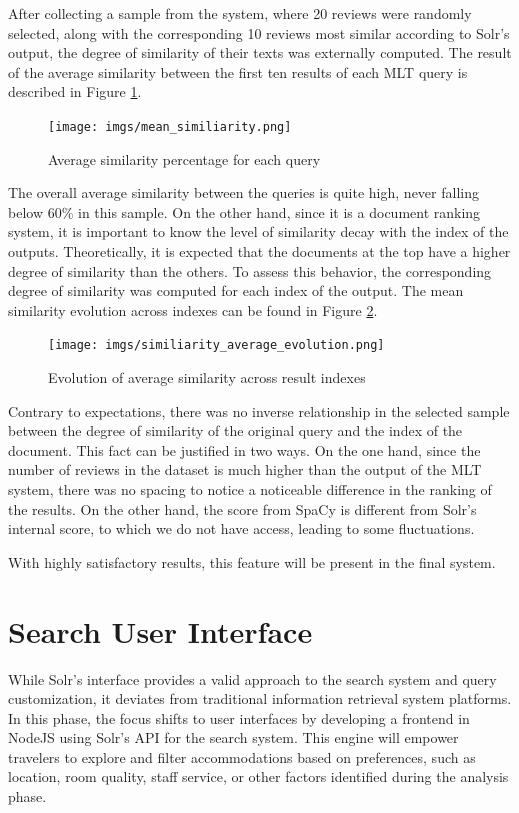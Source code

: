 \documentclass[sigconf]{acmart}
\begin{document}
After collecting a sample from the system, where 20 reviews were randomly selected, along with the corresponding 10 reviews most similar according to Solr's output, the degree of similarity of their texts was externally computed. The result of the average similarity between the first ten results of each MLT query is described in Figure \ref{fig:avg_simi}.

\begin{figure}[h]
  \centering
  \texttt{[image: imgs/mean\_similiarity.png]}
  \caption{Average similarity percentage for each query}
  \label{fig:avg_simi}
\end{figure}

The overall average similarity between the queries is quite high, never falling below 60\% in this sample. On the other hand, since it is a document ranking system, it is important to know the level of similarity decay with the index of the outputs. Theoretically, it is expected that the documents at the top have a higher degree of similarity than the others. To assess this behavior, the corresponding degree of similarity was computed for each index of the output. The mean similarity evolution across indexes can be found in Figure \ref{fig:simi_avg_evo}.


\begin{figure}[h]
  \centering
  \texttt{[image: imgs/similiarity\_average\_evolution.png]}
  \caption{Evolution of average similarity across result indexes}
  \label{fig:simi_avg_evo}
\end{figure}


Contrary to expectations, there was no inverse relationship in the selected sample between the degree of similarity of the original query and the index of the document. This fact can be justified in two ways. On the one hand, since the number of reviews in the dataset is much higher than the output of the MLT system, there was no spacing to notice a noticeable difference in the ranking of the results. On the other hand, the score from SpaCy is different from Solr's internal score, to which we do not have access, leading to some fluctuations.

With highly satisfactory results, this feature will be present in the final system.

\section{Search User Interface}

While Solr's interface provides a valid approach to the search system and query customization, it deviates from traditional information retrieval system platforms. In this phase, the focus shifts to user interfaces by developing a frontend in NodeJS \cite{NodeJS} using Solr's API \cite{Solr_api} for the search system. This engine will empower travelers to explore and filter accommodations based on preferences, such as location, room quality, staff service, or other factors identified during the analysis phase.
\end{document}
